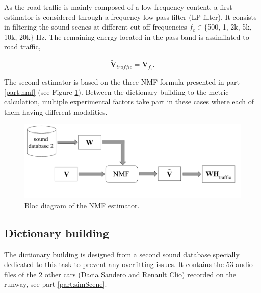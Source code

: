 \documentclass[review,5p,twocolumn,sort&compress,times]{elsarticle}
\begin{document}
As the road traffic is mainly composed of a low frequency content, a first estimator is considered through a frequency low-pass filter (LP filter). It consists in filtering the sound scenes at different cut-off frequencies $f_c \in \lbrace$500, 1, 2k, 5k, 10k, 20k$\rbrace$ Hz. The remaining energy located in the pass-band is assimilated to road traffic, 

\begin{equation}
\mathbf{\tilde{V}}_{traffic} = \mathbf{V}_{f_c}.
\end{equation}

The second estimator is based on the three NMF formula presented in part \ref{part:nmf} (see Figure \ref{fig:bloc_diagram_nmf}). Between the dictionary building to the metric calculation, multiple experimental factors take part in these cases where each of them having different modalities.

\begin{figure}[t]
\centering
\includegraphics[width=.9\linewidth]{figures/bloc_diagram_NMF_EN_2.pdf}
\caption{Bloc diagram of the NMF estimator.}
\label{fig:bloc_diagram_nmf}
\end{figure}

\subsection{Dictionary building}\label{part:dictionary_building}
The dictionary building is designed from a second sound database specially dedicated to this task to prevent any overfitting issues. It contains the 53 audio files of the 2 other cars (Dacia Sandero and Renault Clio) recorded on the runway, see part \ref{part:simScene}. 
\end{document}
